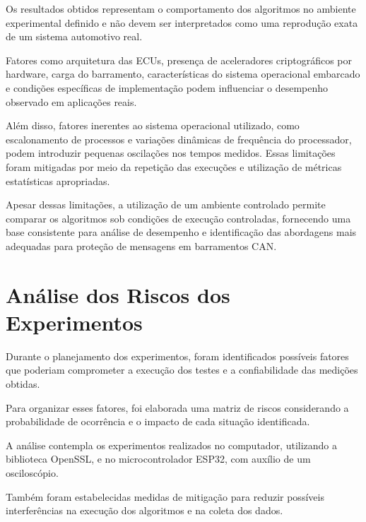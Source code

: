 Os resultados obtidos representam o comportamento dos algoritmos no ambiente experimental definido e não devem ser interpretados como uma reprodução exata de um sistema automotivo real.



Fatores como arquitetura das ECUs, presença de aceleradores criptográficos por hardware, carga do barramento, características do sistema operacional embarcado e condições específicas de implementação podem influenciar o desempenho observado em aplicações reais.



Além disso, fatores inerentes ao sistema operacional utilizado, como escalonamento de processos e variações dinâmicas de frequência do processador, podem introduzir pequenas oscilações nos tempos medidos. Essas limitações foram mitigadas por meio da repetição das execuções e utilização de métricas estatísticas apropriadas.



Apesar dessas limitações, a utilização de um ambiente controlado permite comparar os algoritmos sob condições de execução controladas, fornecendo uma base consistente para análise de desempenho e identificação das abordagens mais adequadas para proteção de mensagens em barramentos CAN.





\section{Análise dos Riscos dos Experimentos}



Durante o planejamento dos experimentos, foram identificados possíveis fatores que poderiam comprometer a execução dos testes e a confiabilidade das medições obtidas.



Para organizar esses fatores, foi elaborada uma matriz de riscos considerando a probabilidade de ocorrência e o impacto de cada situação identificada.



A análise contempla os experimentos realizados no computador, utilizando a biblioteca OpenSSL, e no microcontrolador ESP32, com auxílio de um osciloscópio.



Também foram estabelecidas medidas de mitigação para reduzir possíveis interferências na execução dos algoritmos e na coleta dos dados.





